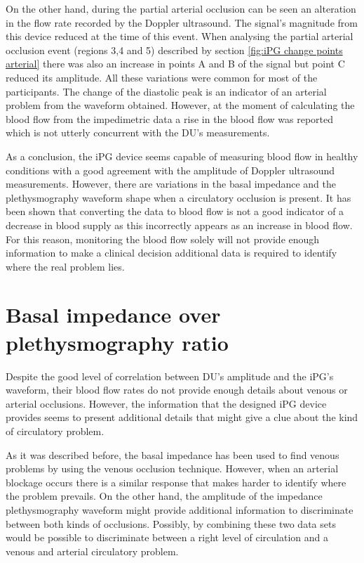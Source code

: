 On the other hand, during the partial arterial occlusion can be seen an alteration in the flow rate recorded by the Doppler ultrasound. The signal's magnitude from this device reduced at the time of this event. When analysing the partial arterial occlusion event (regions 3,4 and 5) described by section \ref{fig:iPG change points arterial} there was also an increase in points A  and B of the signal but point C reduced its amplitude. All these variations were common for most of the participants. The change of the diastolic peak is an indicator of an arterial problem from the waveform obtained. However, at the moment of calculating the blood flow from the impedimetric data a rise in the blood flow was reported which is not utterly concurrent with the DU's measurements. 

As a conclusion, the iPG device seems capable of measuring blood flow in healthy conditions with a good agreement with the amplitude of Doppler ultrasound measurements. However, there are variations in the basal impedance and the plethysmography waveform shape when a circulatory occlusion is present. It has been shown that converting the data to blood flow is not a good indicator of a decrease in blood supply as this incorrectly appears as an increase in blood flow. For this reason, monitoring the blood flow solely will not provide enough information to make a clinical decision additional data is required to identify where the real problem lies.

\section{Basal impedance over plethysmography ratio} %
\label{section discussion 2}

Despite the good level of correlation between DU's amplitude and the iPG's waveform, their blood flow rates do not provide enough details about venous or arterial occlusions. However, the information that the designed iPG device provides seems to present additional details that might give a clue about the kind of circulatory problem. 

As it was described before, the basal impedance has been used to find venous problems by using the venous occlusion technique. However, when an arterial blockage occurs there is a similar response that makes harder to identify where the problem prevails. On the other hand, the amplitude of the impedance plethysmography waveform might provide additional information to discriminate between both kinds of occlusions. Possibly, by combining these two data sets would be possible to discriminate between a right level of circulation and a venous and arterial circulatory problem. 

